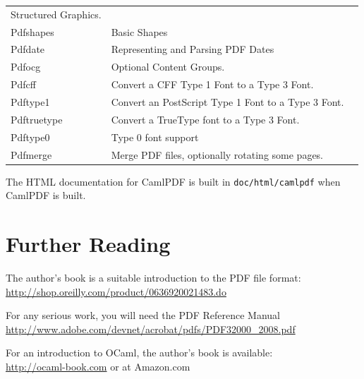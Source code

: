 \documentclass[a4paper]{memoir}
\newcommand{\smallgap}{\vspace{4mm}}
\begin{document}
{\begin{tabular}{lp{10cm}l}
Structured Graphics. & \\
Pdfshapes &
Basic Shapes & \\
Pdfdate &
Representing and Parsing PDF Dates & \\
Pdfocg &
Optional Content Groups. & \\
Pdfcff &
Convert a CFF Type 1 Font to a Type 3 Font. & \\
Pdftype1 &
Convert an PostScript Type 1 Font to a Type 3 Font. & \\
Pdftruetype &
Convert a TrueType font to a Type 3 Font. & \\
Pdftype0 &
Type 0 font support & \\
Pdfmerge &
Merge PDF files, optionally rotating some pages. 
 \end{tabular}
}

\smallgap
\noindent The HTML documentation for CamlPDF is built in \texttt{doc/html/camlpdf} when \textsf{CamlPDF} is built.

\smallgap

\section*{Further Reading}
The author's book is a suitable introduction to the PDF file format:\\
\url{http://shop.oreilly.com/product/0636920021483.do}

\vspace{4mm}

\noindent For any serious work, you will need the PDF Reference Manual\\
\url{http://www.adobe.com/devnet/acrobat/pdfs/PDF32000_2008.pdf}

\vspace{4mm}

\noindent For an introduction to OCaml, the author's book is available:\\
\url{http://ocaml-book.com} or at Amazon.com

\backmatter
\printindex
\end{document}
